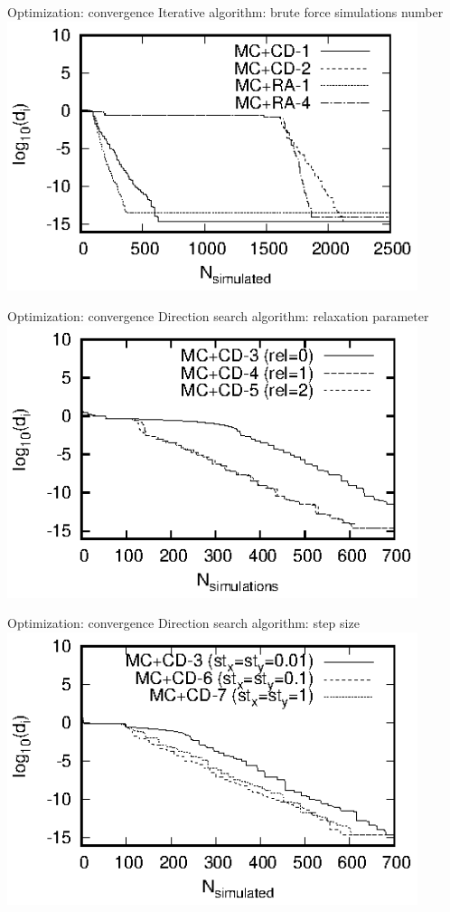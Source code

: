 \documentclass[10pt]{beamer}
\begin{document}
\begin{frame}{Optimization: convergence}
{Iterative algorithm: brute force simulations number}
	\includegraphics[width=0.9\textwidth]{sphere-evolution-mc-cdr.eps}
\end{frame}

\begin{frame}{Optimization: convergence}
{Direction search algorithm: relaxation parameter}
	\includegraphics[width=0.9\textwidth]{sphere-evolution-mc-cd-r.eps}
\end{frame}

\begin{frame}{Optimization: convergence}
{Direction search algorithm: step size}
	\includegraphics[width=0.9\textwidth]{sphere-evolution-mc-cd-s.eps}
\end{frame}
\end{document}
